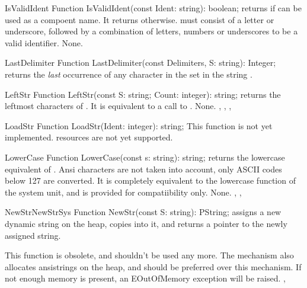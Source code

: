 
 
\begin{function}{IsValidIdent}
\Declaration
Function IsValidIdent(const Ident: string): boolean;
\Description
{} returns  if  can be used as a
compoent name. It returns  otherwise.  must consist of
a letter or underscore, followed by a combination of letters, numbers or
underscores to be a valid identifier.
\Errors
None.
\SeeAlso
\end{function}


 
\begin{function}{LastDelimiter}
\Declaration
Function LastDelimiter(const Delimiters, S: string): Integer;
\Description
{} returns the {\em last} occurrence of any character in
the set  in the string . 
\Errors
\SeeAlso
\end{function}



\begin{function}{LeftStr}
\Declaration
Function LeftStr(const S: string; Count: integer): string;
\Description
{} returns the  leftmost characters of .
It is equivalent to a call to .
\Errors
None.
\SeeAlso
{}, , , 
\end{function}



\begin{function}{LoadStr}
\Declaration
Function LoadStr(Ident: integer): string;
\Description
This function is not yet implemented. resources are not yet supported.
\Errors
\SeeAlso
\end{function}

\begin{function}{LowerCase}
\Declaration
Function LowerCase(const s: string): string;
\Description
{} returns the lowercase equivalent of . Ansi characters
are not taken into account, only ASCII codes below 127 are converted. It is 
completely equivalent to the lowercase function of the system unit, and is
provided for compatiibility only.
\Errors
None.
\SeeAlso
{}, , 
\end{function}


 
\begin{functionl}{NewStr}{NewStrSys}
\Declaration
Function NewStr(const S: string): PString;
\Description
{} assigns a new dynamic string on the heap, copies  into
it, and returns a pointer to the newly assigned string.

This function is obsolete, and shouldn't be used any more. The
 mechanism also allocates ansistrings on the heap, and
should be preferred over this mechanism.
\Errors
If not enough memory is present, an EOutOfMemory exception will be raised.
\SeeAlso
{}, 
\end{functionl}

